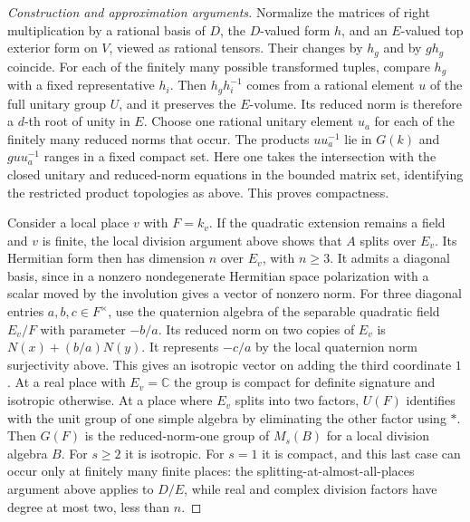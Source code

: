 \documentclass[11pt,a4paper,openany,oneside]{book}
\theoremstyle{resultstyle}
\theoremstyle{definition}
\numberwithin{equation}{chapter}
\begin{document}
\begin{proof}[Construction and approximation arguments]
Normalize the matrices of right multiplication by
a rational basis of \(D\), the \(D\)-valued form \(h\),
and an \(E\)-valued top exterior form on \(V\), viewed
as rational tensors. Their changes by \(h_g\) and by
\(g h_g\) coincide. For each of the finitely many
possible transformed tuples, compare \(h_g\) with a
fixed representative \(h_i\). Then \(h_gh_i^{-1}\)
comes from a rational element \(u\) of the full unitary
group \(U\), and it preserves the \(E\)-volume. Its
reduced norm is therefore a \(d\)-th root of unity
in \(E\). Choose one rational unitary element \(u_a\)
for each of the finitely many reduced norms that
occur. The products \(u u_a^{-1}\) lie in \(G(k)\)
and \(g u u_a^{-1}\) ranges in a fixed compact set.
Here one takes the intersection with the closed unitary
and reduced-norm equations in the bounded matrix set,
identifying the restricted product topologies as above.
This proves compactness.

Consider a local place \(v\) with \(F=k_v\). If the
quadratic extension remains a field and \(v\) is finite,
the local division argument above shows that \(A\)
splits over \(E_v\). Its Hermitian form then has dimension
\(n\) over \(E_v\), with \(n\geq3\). It admits a diagonal
basis, since in a nonzero nondegenerate Hermitian space
polarization with a scalar moved by the involution gives
a vector of nonzero norm. For three diagonal entries
\(a,b,c\in F^\times\), use the quaternion algebra of
the separable quadratic field \(E_v/F\) with parameter
\(-b/a\). Its reduced norm on two copies of \(E_v\)
is \(N(x)+(b/a)N(y)\). It represents \(-c/a\)
by the local quaternion norm surjectivity above.
This gives an isotropic vector on adding the third
coordinate \(1\). At a real place with \(E_v=\mathbb C\)
the group is compact for definite signature and isotropic
otherwise. At a place where \(E_v\) splits into two
factors, \(U(F)\) identifies with the unit group of
one simple algebra by eliminating the other factor
using \(\ast\). Then \(G(F)\) is the reduced-norm-one
group of \(M_s(B)\) for a local division algebra \(B\).
For \(s\geq2\) it is isotropic. For \(s=1\) it is compact,
and this last case can occur only at finitely many finite
places: the splitting-at-almost-all-places argument above
applies to \(D/E\), while real and complex division factors
have degree at most two, less than \(n\).


\end{proof}
\end{document}
